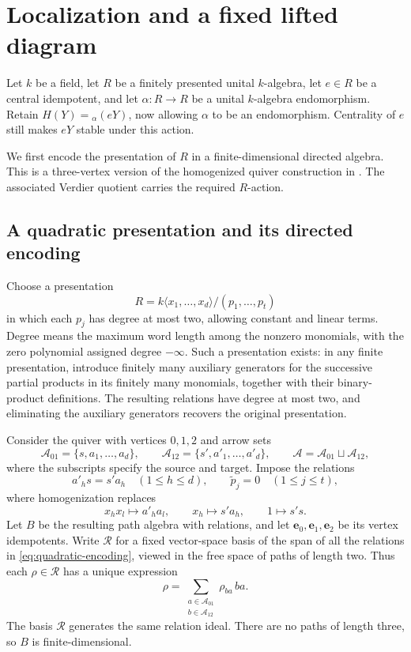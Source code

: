 \documentclass[11pt]{article}
\numberwithin{equation}{section}
\theoremstyle{definition}
\theoremstyle{remark}
\begin{document}
\section{Localization and a fixed lifted diagram}
\label{sec:localization}

Let $k$ be a field, let $R$ be a finitely presented unital $k$-algebra,
let $e\in R$ be a central idempotent, and let
$\alpha:R\to R$ be a unital $k$-algebra endomorphism.  Retain $H(Y)={}_{\alpha}(eY)$, now allowing $\alpha$ to be an
endomorphism. Centrality of $e$ still makes $eY$ stable under this action.

We first encode the presentation of $R$ in a finite-dimensional directed
algebra.  This is a three-vertex version of the homogenized quiver
construction in \cite[Section~1, Theorem~1.1 and Proposition~1.2]{NRS2004}.
The associated Verdier quotient carries the required $R$-action.

\subsection{A quadratic presentation and its directed encoding}

Choose a presentation
\[
  R=k\langle x_1,\ldots,x_d\rangle/(p_1,\ldots,p_t)
\]
in which each $p_j$ has degree at most two, allowing constant and linear
terms. Degree means the maximum word length among the nonzero monomials,
with the zero polynomial assigned degree $-\infty$.
Such a presentation exists: in any finite presentation, introduce
finitely many auxiliary generators for the successive partial products
in its finitely many monomials, together with their binary-product
definitions.  The resulting relations have degree at most two, and
eliminating the auxiliary generators recovers the original presentation.

Consider the quiver with vertices $0,1,2$ and arrow sets
\[
  \mathcal A_{01}=\{s,a_1,\ldots,a_d\},\qquad
  \mathcal A_{12}=\{s',a'_1,\ldots,a'_d\},\qquad
  \mathcal A=\mathcal A_{01}\sqcup\mathcal A_{12},
\]
where the subscripts specify the source and target. Impose the relations
\begin{equation}\label{eq:quadratic-encoding}
  a'_h s=s'a_h\quad(1\le h\le d),
  \qquad \widetilde p_j=0\quad(1\le j\le t),
\end{equation}
where homogenization replaces
\[
  x_hx_l\longmapsto a'_h a_l,\qquad
  x_h\longmapsto s'a_h,\qquad
  1\longmapsto s's.
\]
Let $B$ be the resulting path algebra with relations, and let
$\mathbf e_0,\mathbf e_1,\mathbf e_2$ be its vertex idempotents.
Write $\mathcal R$ for a fixed vector-space basis of the span of all
the relations in \eqref{eq:quadratic-encoding}, viewed in the free
space of paths of length two.  Thus each $\rho\in\mathcal R$ has a
unique expression
\[
  \rho=\sum_{\substack{a\in\mathcal A_{01}\\b\in\mathcal A_{12}}}
             \rho_{ba}\,ba.
\]
The basis $\mathcal R$ generates the same relation ideal.  There are
no paths of length three, so $B$ is finite-dimensional.
\end{document}
